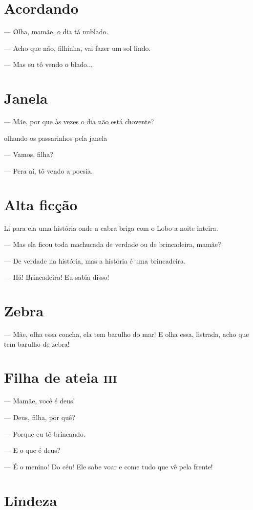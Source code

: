 \chapter{Acordando}

— Olha, mamãe, o dia tá nublado.

— Acho que não, filhinha, vai fazer um sol lindo.

— Mas eu tô vendo o blado...

\chapter{Janela}

— Mãe, por que às vezes o dia não está chovente?

olhando os passarinhos pela janela

— Vamos, filha?

— Pera aí, tô vendo a poesia.

\chapter{Alta ficção}

Li para ela uma história onde a cabra briga com o Lobo a noite inteira.

— Mas ela ficou toda machucada de verdade ou de brincadeira, mamãe?

— De verdade na história, mas a história é uma brincadeira.

— Há! Brincadeira! Eu sabia disso!

\chapter{Zebra}

— Mãe, olha essa concha, ela tem barulho do mar! E olha essa, listrada,
acho que tem barulho de zebra!

\chapter{Filha de ateia \textsc{iii}}

— Mamãe, você é deus!

— Deus, filha, por quê?

— Porque eu tô brincando.

— E o que é deus?

— É o menino! Do céu! Ele sabe voar e come tudo que vê pela frente!

\chapter{Lindeza}

